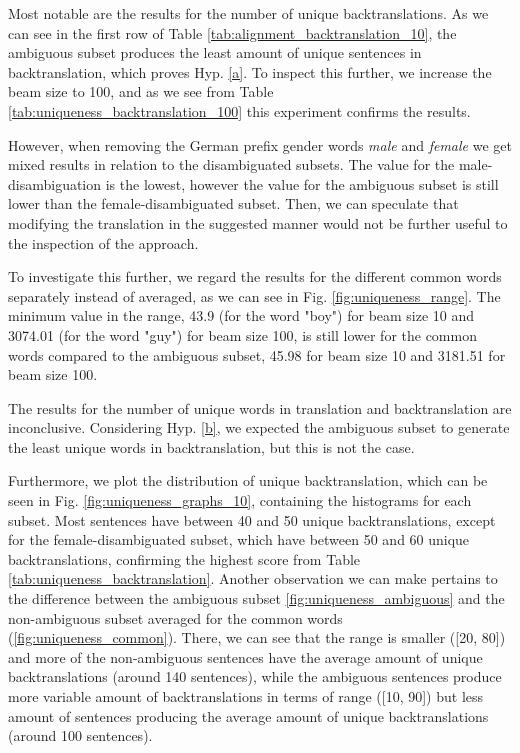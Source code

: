 Most notable are the results for the number of unique backtranslations. As we can see in the first row of Table \ref{tab:alignment_backtranslation_10}, the ambiguous subset produces the least amount of unique sentences in backtranslation, which proves Hyp. \ref{a}. To inspect this further, we increase the beam size to 100, and as we see from Table \ref{tab:uniqueness_backtranslation_100} this experiment confirms the results.

However, when removing the German prefix gender words \textit{male} and \textit{female} we get mixed results in relation to the disambiguated subsets. The value for the male-disambiguation is the lowest, however the value for the ambiguous subset is still lower than the female-disambiguated subset. Then, we can speculate that modifying the translation in the suggested manner would not be further useful to the inspection of the approach.

To investigate this further, we regard the results for the different common words separately instead of averaged, as we can see in Fig. \ref{fig:uniqueness_range}. The minimum value in the range, 43.9 (for the word "boy") for beam size 10 and 3074.01 (for the word "guy") for beam size 100, is still lower for the common words compared to the ambiguous subset, 45.98 for beam size 10 and 3181.51 for beam size 100.

The results for the number of unique words in translation and backtranslation are inconclusive. Considering Hyp. \ref{b}, we expected the ambiguous subset to generate the least unique words in backtranslation, but this is not the case.

Furthermore, we plot the distribution of unique backtranslation, which can be seen in Fig. \ref{fig:uniqueness_graphs_10}, containing the histograms for each subset. Most sentences have between 40 and 50 unique backtranslations, except for the female-disambiguated subset, which have between 50 and 60 unique backtranslations, confirming the highest score from Table \ref{tab:uniqueness_backtranslation}. Another observation we can make pertains to the difference between the ambiguous subset \ref{fig:uniqueness_ambiguous} and the non-ambiguous subset averaged for the common words (\ref{fig:uniqueness_common}). There, we can see that the range is smaller ([20, 80]) and more of the non-ambiguous sentences have the average amount of unique backtranslations (around 140 sentences), while the ambiguous sentences produce more variable amount of backtranslations in terms of range  ([10, 90]) but less amount of sentences producing the average amount of unique backtranslations (around 100 sentences).

